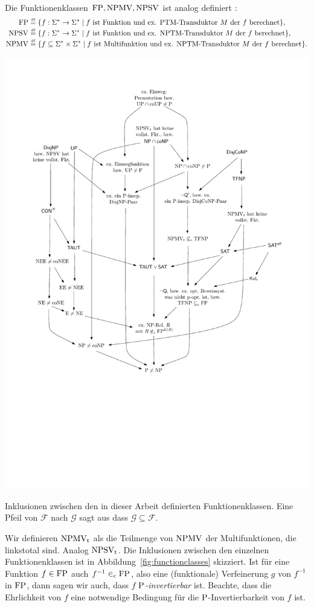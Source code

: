 Die Funktionenklassen $\FP, \mathrm{NPMV}, \mathrm{NPSV}$ ist analog definiert \parencite{selman_taxonomy_1994}:
\begin{align*}
    \FP &\defeq \{ f: \Sigma^*\to\Sigma^* \mid \text{$f$ ist Funktion und ex. PTM-Transduktor $M$ der $f$ berechnet} \},\\
    \NPSV &\defeq \{ f:\Sigma^*\to\Sigma^* \mid \text{$f$ ist Funktion und ex. NPTM-Transduktor $M$ der $f$ berechnet} \},\\
    \NPMV &\defeq \{ f\subseteq \Sigma^*\times\Sigma^* \mid \text{$f$ ist Multifunktion und ex. NPTM-Transduktor $M$ der $f$ berechnet} \}.
\end{align*}
\begin{marginfigure}
    \centering\includegraphics[page=9]{figures.pdf}
    \caption{Inklusionen zwischen den in dieser Arbeit definierten Funktionenklassen. Eine Pfeil von $\mathcal F$ nach $\mathcal G$ sagt aus dass $\mathcal{G}\subseteq \mathcal F$.}\label{fig:functionclasses}
\end{marginfigure}
Wir definieren $\NPMVt$ als die Teilmenge von $\NPMV$ der Multifunktionen, die linkstotal sind. Analog $\NPSVt$. Die Inklusionen zwischen den einzelnen Funktionenklassen ist in Abbildung~\ref{fig:functionclasses} skizziert.
Ist für eine Funktion $f\in\FP$ auch $f^{-1}\inc \FP$, also eine (funktionale) Verfeinerung $g$ von $f^{-1}$ in $\FP$, dann sagen wir auch, dass $f$ \emph{$\P$-invertierbar} ist. Beachte, dass die Ehrlichkeit von $f$ eine notwendige Bedingung für die $\P$-Invertierbarkeit von $f$ ist.

